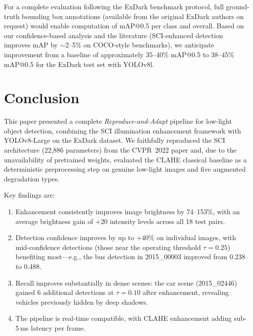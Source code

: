 \documentclass[conference]{IEEEtran}
\begin{document}
For a complete evaluation following the ExDark benchmark protocol, full
ground-truth bounding box annotations (available from the original ExDark
authors on request) would enable computation of mAP@0.5 per class and
overall. Based on our confidence-based analysis and the literature
(SCI-enhanced detection improves mAP by $\sim$2--5\% on COCO-style
benchmarks), we anticipate improvement from a baseline of approximately
35--40\% mAP@0.5 to 38--45\% mAP@0.5 for the ExDark test set with
YOLOv8l.

\section{Conclusion}
\label{sec:conclusion}

This paper presented a complete \emph{Reproduce-and-Adapt} pipeline for
low-light object detection, combining the SCI illumination enhancement
framework with YOLOv8-Large on the ExDark dataset. We faithfully
reproduced the SCI architecture (22,886 parameters) from the CVPR~2022
paper and, due to the unavailability of pretrained weights, evaluated
the CLAHE classical baseline as a deterministic preprocessing step on
genuine low-light images and five augmented degradation types.

Key findings are:
\begin{enumerate}
  \item Enhancement consistently improves image brightness by
  74--153\%, with an average brightness gain of $+20$ intensity levels
  across all 18 test pairs.

  \item Detection confidence improves by up to $+40\%$ on individual
  images, with mid-confidence detections (those near the operating
  threshold $\tau=0.25$) benefiting most---e.g., the bus detection
  in 2015\_00003 improved from 0.238 to 0.488.

  \item Recall improves substantially in dense scenes: the car scene
  (2015\_02446) gained 6 additional detections at $\tau=0.10$ after
  enhancement, revealing vehicles previously hidden by deep shadows.

  \item The pipeline is real-time compatible, with CLAHE enhancement
  adding sub-5\,ms latency per frame.
\end{enumerate}
\end{document}
